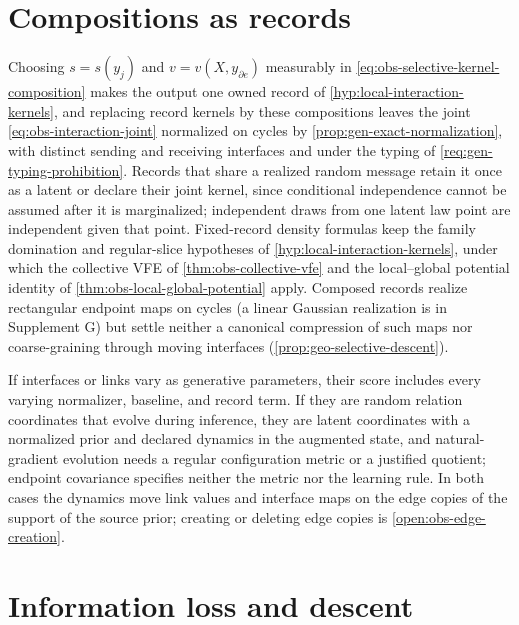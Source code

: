 \section{Compositions as records}
\label{sec:selective-records}

Choosing \(s=s(y_j)\) and \(v=v(X,y_{\partial e})\) measurably in
\eqref{eq:obs-selective-kernel-composition} makes the output one owned record
of \cref{hyp:local-interaction-kernels}, and replacing record kernels by these
compositions leaves the joint \eqref{eq:obs-interaction-joint} normalized on
cycles by \cref{prop:gen-exact-normalization}, with distinct sending and
receiving interfaces and under the typing of \cref{req:gen-typing-prohibition}.
Records that share a realized random message retain it once as a latent or
declare their joint kernel, since conditional independence cannot be assumed
after it is marginalized; independent draws from one latent law point are
independent given that point. Fixed-record density formulas keep the family
domination and regular-slice hypotheses of \cref{hyp:local-interaction-kernels},
under which the collective VFE of \cref{thm:obs-collective-vfe} and the
local--global potential identity of \cref{thm:obs-local-global-potential}
apply. Composed records realize rectangular endpoint maps on cycles (a linear
Gaussian realization is in Supplement G) but settle neither a canonical
compression of such maps nor coarse-graining through moving interfaces
(\cref{prop:geo-selective-descent}).

If interfaces or links vary as generative parameters, their score includes
every varying normalizer, baseline, and record term. If they are random
relation coordinates that evolve during inference, they are latent coordinates
with a normalized prior and declared dynamics in the augmented state, and
natural-gradient evolution needs a regular configuration metric or a justified
quotient; endpoint covariance specifies neither the metric nor the learning
rule. In both cases the dynamics move link values and interface maps on the
edge copies of the support of the source prior; creating or deleting edge
copies is \cref{open:obs-edge-creation}.

\section{Information loss and descent}
\label{sec:selective-information}

